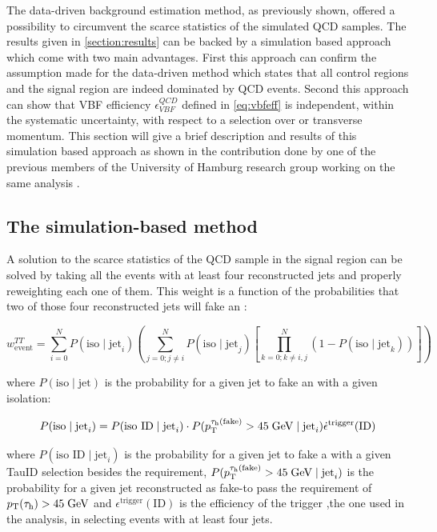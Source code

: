 The data-driven background estimation method, as previously shown, offered a possibility to circumvent the scarce statistics of the simulated QCD samples. The results given in \autoref{section:results} can be backed by a simulation based approach which come with two main advantages. First this approach can confirm the assumption made for the data-driven method which states that all control regions and the signal region are indeed dominated by QCD events. Second this approach can show that VBF efficiency $\epsilon^{QCD}_{VBF}$ defined in \autoref{eq:vbfeff} is independent, within the systematic uncertainty, with respect to a selection over \met or \hadtau transverse momentum. This section will give a brief description and results of this simulation based approach as shown in the contribution done by one of the previous members of the University of Hamburg research group working on the same analysis \cite{bib:phdthesis:denis}.

\subsection{The simulation-based method}

A solution to the scarce statistics of the QCD sample in the signal region can be solved by taking all the events with at least four reconstructed jets and properly reweighting each one of them. This weight is a function of the probabilities that two of those four reconstructed jets will fake an \hadtau:

\begin{equation}
w^{TT}_{\text{event}} = \sum_{i=0}^{N}P(\text{iso}\mid \text{jet}_{i})\left(\sum_{j=0; j\neq i}^{N}P(\text{iso}\mid \text{jet}_{j})\left[\prod_{k=0; k\neq i,j}^{N}(1-P(\text{iso}\mid \text{jet}_{k}))\right]\right)
\end{equation}

where $P(\text{iso}\mid \text{jet})$ is the probability for a given jet to fake an \hadtau with a given isolation:

\begin{equation}
P(\text{iso}\mid \text{jet}_{i}) = P(\text{iso ID}\mid \text{jet}_{i}) \cdot P(p_{\text{T}}^{\tau_{\text{h}}(\text{fake})} > 45\;\text{Ge}\kern-0.06667em\text{V}\mid \text{jet}_{i}) \dot \epsilon^{\text{trigger}}(\text{ID})
\end{equation}

where $P(\text{iso ID}\mid \text{jet}_{i})$ is the probability for a given jet to fake a \hadtau with a given TauID selection besides the \pt requirement, $P(p_{\text{T}}^{\tau_{\text{h}}(\text{fake})} > 45\;\text{Ge}\kern-0.06667em\text{V}\mid \text{jet}_{i})$ is the probability for a given jet reconstructed as fake-\hadtau to pass the requirement of $p_{\text{T}}(\tau_{\text{h}})> 45\;\text{Ge}\kern-0.06667em\text{V}$ and $\epsilon^{\text{trigger}}(\text{ID})$ is the efficiency of the trigger ,the one used in the analysis, in selecting events with at least four jets.

